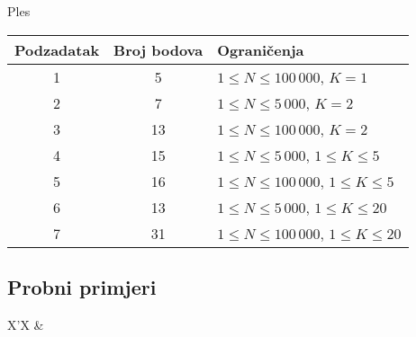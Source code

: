 \begin{statement}[
  problempoints=100,
  timelimit=1 sekunda,
  memorylimit=512 MiB,
]{Ples}
{\renewcommand{\arraystretch}{1.4}
  \setlength{\tabcolsep}{6pt}
  \begin{tabular}{ccl}
   Podzadatak & Broj bodova & Ograničenja \\ \midrule
    1 & 5 & $1 \le N \le 100\,000$, $K = 1$\\
    2 & 7 & $1 \le N \le 5\,000$, $K = 2$ \\
    3 & 13 & $1 \le N \le 100\,000$, $K = 2$ \\
    4 & 15 & $1 \le N \le 5\,000$, $1 \leq K \leq 5$ \\
    5 & 16 & $1 \le N \le 100\,000$, $1 \leq K \leq 5$ \\
    6 & 13 & $1 \le N \le 5\,000$, $1 \leq K \leq 20$ \\
    7 & 31 & $1 \le N \le 100\,000$, $1 \leq K \leq 20$ \\
\end{tabular}}

\subsection*{Probni primjeri}
\begin{tabularx}{\textwidth}{X'X}
 &
\end{tabularx}

\end{statement}

